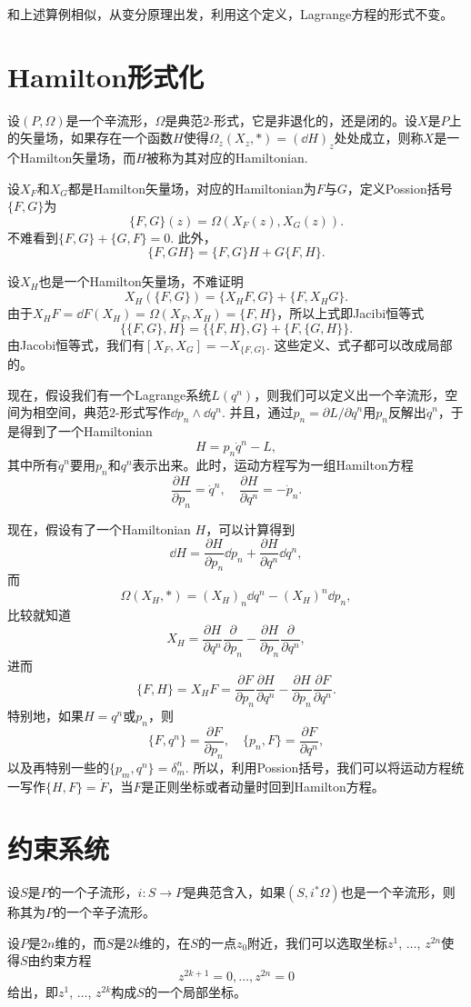 \documentclass[11pt]{article}
\theoremstyle{definition}
\theoremstyle{plain}
\newcommand{\pfrac}[2]{\frac{\partial #1}{\partial #2}}
\begin{document}
和上述算例相似，从变分原理出发，利用这个定义，Lagrange方程的形式不变。

\section{Hamilton形式化}

设$(P,\Omega)$是一个辛流形，$\Omega$是典范$2$-形式，它是非退化的，还是闭的。设$X$是$P$上的矢量场，如果存在一个函数$H$使得$\Omega_z(X_z,*)=(\dd H)_z$处处成立，则称$X$是一个Hamilton矢量场，而$H$被称为其对应的Hamiltonian.

设$X_F$和$X_G$都是Hamilton矢量场，对应的Hamiltonian为$F$与$G$，定义Possion括号$\{F,G\}$为
\[
	\{F,G\}(z)=\Omega(X_F(z),X_G(z)).
\]
不难看到$\{F,G\}+\{G,F\}=0$. 此外，
\[
	\{F,GH\}=\{F,G\}H+G\{F,H\}.
\]

设$X_H$也是一个Hamilton矢量场，不难证明
\[
	X_H(\{F,G\})=\{X_HF,G\}+\{F,X_HG\}.
\]
由于$X_HF=\dd F(X_H)=\Omega(X_F,X_H)=\{F,H\}$，所以上式即Jacibi恒等式
\[
	\{\{F,G\},H\}=\{\{F,H\},G\}+\{F,\{G,H\}\}.
\]
由Jacobi恒等式，我们有$[X_F,X_G]=-X_{\{F,G\}}$. 这些定义、式子都可以改成局部的。

现在，假设我们有一个Lagrange系统$L(q^n)$，则我们可以定义出一个辛流形，空间为相空间，典范$2$-形式写作$\dd p_n\wedge \dd q^n$. 并且，通过$p_n=\partial L/\partial \dot q^n$用$p_n$反解出$\dot q^n$，于是得到了一个Hamiltonian
\[
	H=p_n\dot q^n-L,
\]
其中所有$\dot q^n$要用$p_n$和$q^n$表示出来。此时，运动方程写为一组Hamilton方程
\[
	\pfrac{H}{p_n}=\dot q^n,\quad \pfrac{H}{q^n}=-\dot p_n.
\]

现在，假设有了一个Hamiltonian $H$，可以计算得到
\[
	\dd H=\pfrac H{p_n}\dd p_n+\pfrac H{q^n}\dd q^n,
\]
而
\[
	\Omega(X_H,*)=(X_H)_n \dd q^n-(X_H)^n \dd p_n,
\]
比较就知道
\[
	X_H=\pfrac H{q^n}\pfrac {}{p_n}-\pfrac H{p_n}\pfrac {}{q^n},
\]
进而
\[
	\{F,H\}=X_HF=\pfrac {F}{p_n}\pfrac H{q^n}-\pfrac H{p_n}\pfrac {F}{q^n}.
\]
特别地，如果$H=q^n$或$p_n$，则
\[
	\{F,q^n\}=\pfrac {F}{p_n},\quad \{p_n,F\}=\pfrac {F}{q^n},
\]
以及再特别一些的$\{p_m,q^n\}=\delta^n_m$. 所以，利用Possion括号，我们可以将运动方程统一写作$\{H,F\}=\dot F$，当$F$是正则坐标或者动量时回到Hamilton方程。

\section{约束系统}

设$S$是$P$的一个子流形，$i:S\to P$是典范含入，如果$(S,i^*\Omega)$也是一个辛流形，则称其为$P$的一个辛子流形。

设$P$是$2n$维的，而$S$是$2k$维的，在$S$的一点$z_0$附近，我们可以选取坐标$z^1$, $\dots$, $z^{2n}$使得$S$由约束方程
\[
	z^{2k+1}=0,\dots,z^{2n}=0
\]
给出，即$z^1$, $\dots$, $z^{2k}$构成$S$的一个局部坐标。
\end{document}
